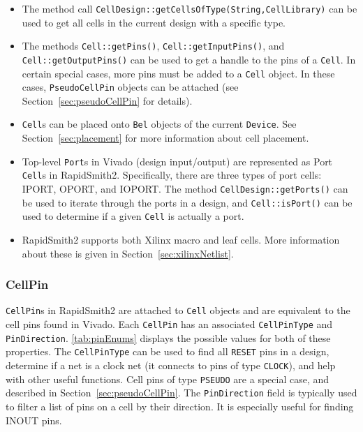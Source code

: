 \begin {itemize}
  \item The method call \texttt{CellDesign::getCellsOfType(String,CellLibrary)}
  can be used to get all cells in the current design with a specific type.
  
  \item The methods \texttt{Cell::getPins()},
  \texttt{Cell::getInputPins()}, and \texttt{Cell::getOutputPins()} can be used
  to get a handle to the pins of a \texttt{Cell}. In certain special cases, more
  pins must be added to a \texttt{Cell} object.  In these cases,
  \texttt{PseudoCellPin} objects can be attached (see
  Section~\ref{sec:pseudoCellPin} for details).
  
  \item \texttt{Cell}s can be placed onto \texttt{Bel} objects of the
  current \texttt{Device}. See Section~\ref{sec:placement} for more information about
  cell placement.
  
  \item Top-level \texttt{Port}s in Vivado (design input/output) are represented as
  Port \texttt{Cell}s in RapidSmith2. Specifically, there are three types of
  port cells: IPORT, OPORT, and IOPORT. The method \texttt{CellDesign::getPorts()} can
  be used to iterate through the ports in a design, and 
  \texttt{Cell::isPort()} can be used to determine if a given \texttt{Cell} is
  actually a port.
  
  \item RapidSmith2 supports both Xilinx macro and leaf cells. More information
  about these is given in Section~\ref{sec:xilinxNetlist}.
\end{itemize}

\subsubsection{CellPin} \label{sec:cellPin}

\texttt{CellPin}s in RapidSmith2 are attached to \texttt{Cell} objects
and are equivalent to the cell pins found in Vivado. Each \texttt{CellPin}
has an associated \texttt{CellPinType} and \texttt{PinDirection}.
\autoref{tab:pinEnums} displays the possible values for both of these
properties. The \texttt{CellPinType} can be used to find all \texttt{RESET}
pins in a design, determine if a net is a clock net (it connects to pins of type
\texttt{CLOCK}), and help with other useful functions. Cell pins of type
\texttt{PSEUDO} are a special case, and described in Section~\ref{sec:pseudoCellPin}.
The \texttt{PinDirection} field is typically used to filter a list of
pins on a cell by their direction. It is especially useful for finding INOUT
pins.

